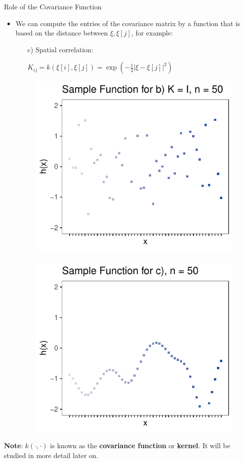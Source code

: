 \documentclass[11pt,compress,t,notes=noshow, xcolor=table]{beamer}
\begin{document}
\begin{vbframe}{Role of the Covariance Function}
\begin{itemize}
  \framebreak 

  \item We can compute the entries of the covariance matrix by a function that is based on the distance between $\xi, \xi[j]$, for example: 
  
  \vspace*{0.2cm}
  \begin{enumerate}
    \item[c)] Spatial correlation: \begin{footnotesize}$K_{ij} = k(\xi[i], \xi[j]) = \exp\left(-\frac{1}{2}\left|\xi - \xi[j]\right|^2\right)$\end{footnotesize}
  \end{enumerate}
  
\begin{figure}
  \includegraphics[width=0.45\linewidth]{figure/discrete/example_extreme_50_4.pdf} ~~  \includegraphics[width=0.45\linewidth]{figure/discrete/example_extreme_50_3.pdf}
\end{figure}

\end{itemize}

\begin{footnotesize}
\textbf{Note}: $k(\cdot,\cdot)$ is known as the \textbf{covariance function} or \textbf{kernel}. It will be studied in more detail later on.
\end{footnotesize}

\end{vbframe}
\end{document}
